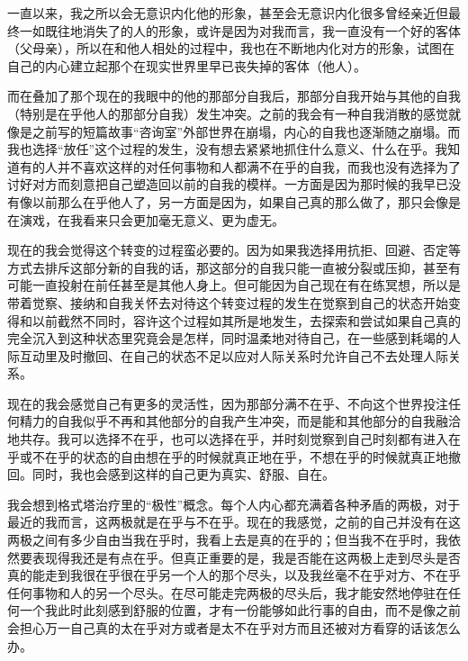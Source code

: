 一直以来，我之所以会无意识内化他的形象，甚至会无意识内化很多曾经亲近但最终一如既往地消失了的人的形象，或许是因为对我而言，我一直没有一个好的客体（父母亲），所以在和他人相处的过程中，我也在不断地内化对方的形象，试图在自己的内心建立起那个在现实世界里早已丧失掉的客体（他人）。

而在叠加了那个现在的我眼中的他的那部分自我后，那部分自我开始与其他的自我（特别是在乎他人的那部分自我）发生冲突。之前的我会有一种自我消散的感觉\pozhehao{}就像是之前写的短篇故事“咨询室”\pozhehao{}外部世界在崩塌，内心的自我也逐渐随之崩塌。而我也选择“放任”这个过程的发生，没有想去紧紧地抓住什么意义、什么在乎。我知道有的人并不喜欢这样的对任何事物和人都满不在乎的自我，而我也没有选择为了讨好对方而刻意把自己塑造回以前的自我的模样。一方面是因为那时候的我早已没有像以前那么在乎他人了，另一方面是因为，如果自己真的那么做了，那只会像是在演戏，在我看来只会更加毫无意义、更为虚无。

现在的我会觉得这个转变的过程蛮必要的。因为如果我选择用抗拒、回避、否定等方式去排斥这部分新的自我的话，那这部分的自我只能一直被分裂或压抑，甚至有可能一直投射在前任甚至是其他人身上。但可能因为自己现在有在练冥想，所以是带着觉察、接纳和自我关怀去对待这个转变过程的发生\pozhehao{}在觉察到自己的状态开始变得和以前截然不同时，容许这个过程如其所是地发生，去探索和尝试如果自己真的完全沉入到这种状态里究竟会是怎样，同时温柔地对待自己，在一些感到耗竭的人际互动里及时撤回、在自己的状态不足以应对人际关系时允许自己不去处理人际关系。

现在的我会感觉自己有更多的灵活性，因为那部分满不在乎、不向这个世界投注任何精力的自我似乎不再和其他部分的自我产生冲突，而是能和其他部分的自我融洽地共存。我可以选择不在乎，也可以选择在乎，并时刻觉察到自己时刻都有进入在乎或不在乎的状态的自由\pozhehao{}想在乎的时候就真正地在乎，不想在乎的时候就真正地撤回。同时，我也会感到这样的自己更为真实、舒服、自在。

我会想到格式塔治疗里的“极性”概念。每个人内心都充满着各种矛盾的两极，对于最近的我而言，这两极就是在乎与不在乎。现在的我感觉，之前的自己并没有在这两极之间有多少自由\pozhehao{}当我在乎时，我看上去是真的在乎的；但当我不在乎时，我依然要表现得我还是有点在乎。但真正重要的是，我是否能在这两极上走到尽头\pozhehao{}是否真的能走到我很在乎很在乎另一个人的那个尽头，以及我丝毫不在乎对方、不在乎任何事物和人的另一个尽头。在尽可能走完两极的尽头后，我才能安然地停驻在任何一个我此时此刻感到舒服的位置，才有一份能够如此行事的自由，而不是像之前会担心万一自己真的太在乎对方或者是太不在乎对方而且还被对方看穿的话该怎么办。

